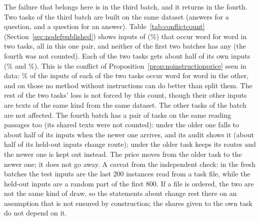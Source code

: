 \begin{table}[t]
  \caption{Fresh tasks: each rule was chosen on the benchmark tasks and read once on a batch of 30 tasks that nothing had used. Rows: the rule and the batch. Columns, means over the 30 tasks, in \%: test inputs given to their own task right after their task arrived and after the last task; routes changed; audit $H/m$ and 95\% bound where the rule has an audit. Verdict: use / guarantee, by the lines in the text (works: at least 85\% own task at arrival and at the end; does not: below 70\%; else partial). The last column is the number of tasks below 70\% own task.}
  \label{tab:recogniserfresh}
  \centering
  
\end{table}

The failure that belongs here is in the third batch, and it returns in the fourth.
Two tasks of the third batch are built on the same dataset (answers for a question, and a question for an answer).
Table~\ref{tab:conflictcount} (Section~\ref{sec:nodefpublished}) shows \AudConfFiveShared{} inputs of \AudConfFiveInputs{} (\AudConfFiveShare{}\%) that occur word for word in two tasks, all in this one pair, and neither of the first two batches has any (the fourth was not counted).
Each of the two tasks gets about half of its own inputs (\AudFreshThirdPairLow{}\% and \AudFreshThirdPairHigh{}\%).
This is the conflict of Proposition~\ref{prop:noinstructionprice} seen in data: \AudConfPairShare{}\% of the inputs of each of the two tasks occur word for word in the other, and on those no method without instructions can do better than split them. The rest of the two tasks' loss is not forced by this count, though their other inputs are texts of the same kind from the same dataset. The other tasks of the batch are not affected.
The fourth batch has a pair of tasks on the same reading passages too (its shared texts were not counted): under \recog{} the older one falls to about half of its inputs when the newer one arrives, and its audit shows it (about half of its held-out inputs change route); under \handicap{} the older task keeps its routes and the newer one is kept out instead. The price moves from the older task to the newer one; it does not go away.
A caveat from the independent check: in the fresh batches the test inputs are the last 200 instances read from a task file, while the held-out inputs are a random part of the first 800.
If a file is ordered, the two are not the same kind of draw, so the statements about change rest there on an assumption that is not ensured by construction; the shares given to the own task do not depend on it.

